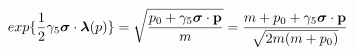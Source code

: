 \begin{equation}
exp\{ \frac{1}{2} \gamma_{5} \mbox{\boldmath $\sigma$} \cdot \mbox{\boldmath $\lambda$}(p)\} =\sqrt{
\frac{p_{0} + \gamma_{5} \mbox{\boldmath $\sigma$} \cdot {\bf p}}{m}}=
\frac{m+p_{0} + \gamma_{5} \mbox{\boldmath $\sigma$} \cdot {\bf p}}
{\sqrt{2 m (m+p_{0})}}  
\end{equation}

